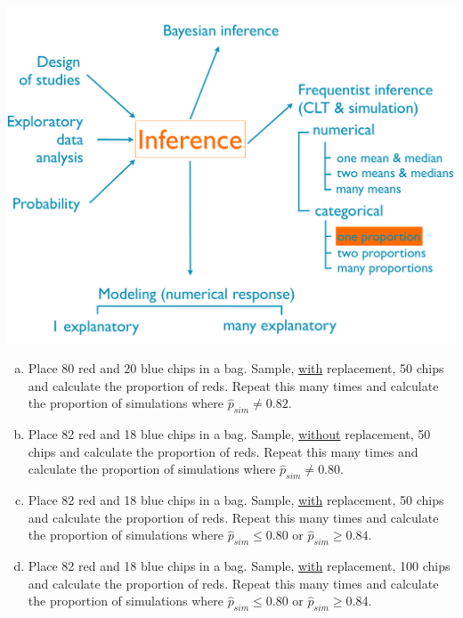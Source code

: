 \documentclass[11pt,containsverbatim,handout,xcolor=xelatex,dvipsnames,table]{beamer}
\newcommand{\solnMult}[1]{#1}
\begin{document}
\begin{frame}

{
{\scriptsize
{}}}
{
 \includegraphics[width=\textwidth]{figures/map/one_prop}
}

\vfill

{\footnotesize
\begin{enumerate}[(a)]
\item Place 80 red and 20 blue chips in a bag. Sample, \underline{with} replacement, 50 chips and calculate the proportion of reds. Repeat this many times and calculate the proportion of simulations where $\hat{p}_{sim} \ne 0.82$. 
\item Place 82 red and 18 blue chips in a bag. Sample, \underline{without} replacement, 50 chips and calculate the proportion of reds. Repeat this many times and calculate the proportion of simulations where $\hat{p}_{sim} \ne 0.80$.
\item \solnMult{Place 82 red and 18 blue chips in a bag. Sample, \underline{with} replacement, 50 chips and calculate the proportion of reds. Repeat this many times and calculate the proportion of simulations where $\hat{p}_{sim} \le 0.80$ or $\hat{p}_{sim} \ge 0.84$.}
\item Place 82 red and 18 blue chips in a bag. Sample, \underline{with} replacement, 100 chips and calculate the proportion of reds. Repeat this many times and calculate the proportion of simulations where $\hat{p}_{sim} \le 0.80$ or $\hat{p}_{sim} \ge 0.84$. 
\end{enumerate}
}

\end{frame}
\end{document}
